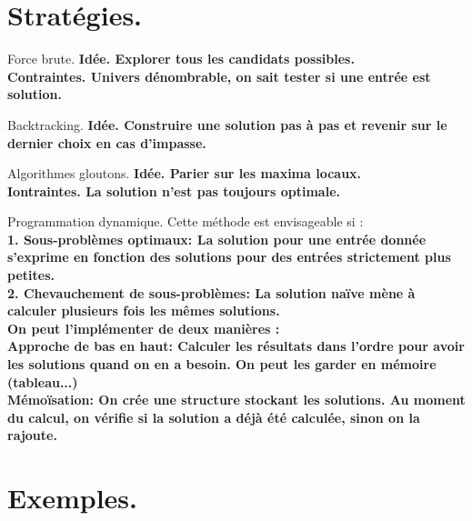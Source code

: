 \documentclass[french, 11pt]{article}
\begin{document}


\section{Stratégies.}

\begin{defi}{Force brute.}{}
    \bf{Idée.} Explorer tous les candidats possibles.\\
    \bf{Contraintes.} Univers dénombrable, on sait tester si une entrée est solution.
\end{defi}

\vspace*{-0.7cm}

\begin{defi}{Backtracking.}{}
    \bf{Idée.} Construire une solution pas à pas et revenir sur le dernier choix en cas d'impasse.
\end{defi}

\vspace*{-0.7cm}

\begin{defi}{Algorithmes gloutons.}{}
    \bf{Idée.} Parier sur les maxima locaux.\\
    \bf{Iontraintes.} La solution n'est pas toujours optimale.
\end{defi}

\vspace*{-0.7cm}

\begin{defi}{Programmation dynamique.}{}
    Cette méthode est envisageable si :\\
    \bf{1. Sous-problèmes optimaux:} La solution pour une entrée donnée s'exprime en fonction des solutions pour des entrées strictement plus petites.\\
    \bf{2. Chevauchement de sous-problèmes:} La solution naïve mène à calculer plusieurs fois les mêmes solutions.\\
    On peut l'implémenter de deux manières :\\
    \bf{Approche de bas en haut:} Calculer les résultats dans l'ordre pour avoir les solutions quand on en a besoin. On peut les garder en mémoire (tableau...)\\
    \bf{Mémoïsation:} On crée une structure stockant les solutions. Au moment du calcul, on vérifie si la solution a déjà été calculée, sinon on la rajoute.
\end{defi}

\section{Exemples.}
\end{document}
